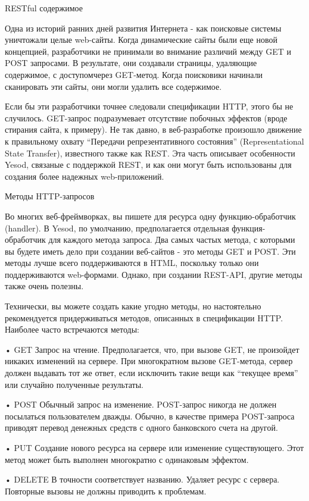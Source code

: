 RESTful содержимое

Одна из историй ранних дней развития Интернета - как поисковые системы уничтожали целые web-сайты. Когда динамические сайты были еще новой концепцией, разработчики не принимали во внимание различий между GET и POST запросами. В результате, они создавали страницы, удаляющие содержимое, с доступомчерез GET-метод. Когда поисковики начинали сканировать эти сайты, они могли удалить все содержимое.

Если бы эти разработчики точнее следовали спецификации HTTP, этого бы не случилось. GET-запрос подразумевает отсутствие побочных эффектов (вроде стирания сайта, к примеру). Не так давно, в веб-разработке произошло движение к правильному охвату “Передачи репрезентативного состояния” (Representational State Transfer), известного также как REST. Эта часть описывает особенности Yesod, связаные с поддержкой REST, и как они могут быть использованы для создания более надежных web-приложений.

Методы HTTP-запросов

Во многих веб-фреймворках, вы пишете для ресурса одну функцию-обработчик (handler). В Yesod, по умолчанию, предполагается отдельная функция-обработчик для каждого метода запроса. Два самых частых метода, с которыми вы будете иметь дело при создании веб-сайтов - это методы GET и POST. Эти методы лучше всего поддерживаются в HTML, поскольку только они поддерживаются web-формами. Однако, при создании REST-API, другие методы также очень полезны.

Технически, вы можете создать какие угодно методы, но настоятельно рекомендуется придерживаться методов, описанных в спецификации HTTP. Наиболее часто встречаются методы:

• GET
Запрос на чтение. Предполагается, что, при вызове GET, не произойдет никаких изменений на сервере. При многократном вызове GET-метода, сервер должен выдавать тот же ответ, если исключить такие вещи как “текущее время” или случайно полученные результаты.

• POST
Обычный запрос на изменение. POST-запрос никогда не должен посылаться пользователем дважды. Обычно, в качестве примера POST-запроса приводят перевод денежных средств с одного банковского счета на другой.

• PUT
Создание нового ресурса на сервере или изменение существующего. Этот метод может быть выполнен многократно с одинаковым эффектом.

• DELETE
В точности соответствует названию. Удаляет ресурс с сервера. Повторные вызовы не должны приводить к проблемам.

